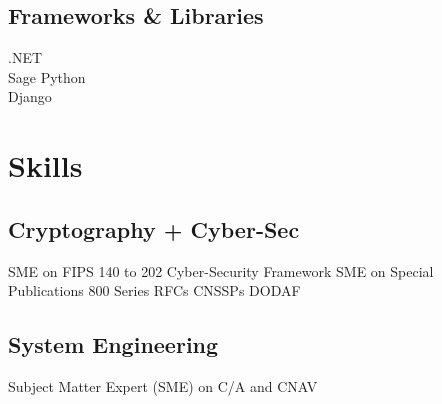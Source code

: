\documentclass[letterpaper]{clinton-resume}
\begin{document}
\begin{minipage}[t]{0.33\textwidth}
\sectionspace %

\subsection{Frameworks \& Libraries}
\begin{tighttabular}
.NET\\
Sage Python\\
Django \\
\end{tighttabular}
\sectionspace %
\section{Skills}
\subsection{Cryptography + Cyber-Sec}
SME on FIPS 140 to 202 \textbullet{} Cyber-Security Framework \textbullet{} SME on Special Publications 800 Series \textbullet{} RFCs \textbullet{} CNSSPs \textbullet{} DODAF\\
\subsection{System Engineering}
Subject Matter Expert (SME) on C/A and CNAV
\end{minipage}
\end{document}
